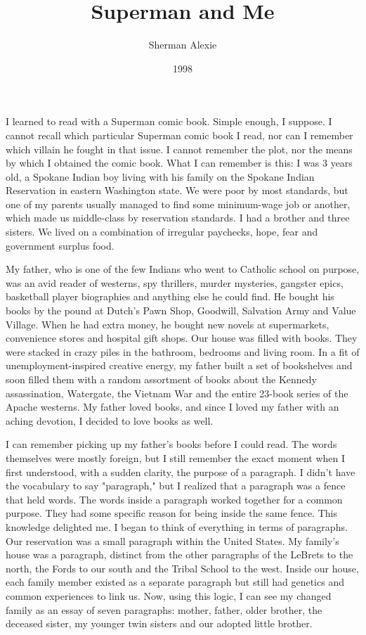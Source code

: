 \documentclass[10pt,a4paper]{article}
\begin{document}
\title{Superman and Me}
\date{1998}
\author{Sherman Alexie}

\maketitle

\noindent\linenumbers I learned to read with a Superman comic book. Simple enough, I suppose. I cannot recall which particular Superman comic book I read, nor can I remember which villain he fought in that issue. I cannot remember the plot, nor the means by which I obtained the comic book. What I can remember is this: I was 3 years old, a Spokane Indian boy living with his family on the Spokane Indian Reservation in eastern Washington state. We were poor by most standards, but one of my parents usually managed to find some minimum-wage job or another, which made us middle-class by reservation standards. I had a brother and three sisters. We lived on a combination of irregular paychecks, hope, fear and government surplus food.

My father, who is one of the few Indians who went to Catholic school on purpose, was an avid reader of westerns, spy thrillers, murder mysteries, gangster epics, basketball player biographies and anything else he could find. He bought his books by the pound at Dutch's Pawn Shop, Goodwill, Salvation Army and Value Village. When he had extra money, he bought new novels at supermarkets, convenience stores and hospital gift shops. Our house was filled with books. They were stacked in crazy piles in the bathroom, bedrooms and living room. In a fit of unemployment-inspired creative energy, my father built a set of bookshelves and soon filled them with a random assortment of books about the Kennedy assassination, Watergate, the Vietnam War and the entire 23-book series of the Apache westerns. My father loved books, and since I loved my father with an aching devotion, I decided to love books as well.

I can remember picking up my father's books before I could read. The words themselves were mostly foreign, but I still remember the exact moment when I first understood, with a sudden clarity, the purpose of a paragraph. I didn't have the vocabulary to say "paragraph," but I realized that a paragraph was a fence that held words. The words inside a paragraph worked together for a common purpose. They had some specific reason for being inside the same fence. This knowledge delighted me. I began to think of everything in terms of paragraphs. Our reservation was a small paragraph within the United States. My family's house was a paragraph, distinct from the other paragraphs of the LeBrets to the north, the Fords to our south and the Tribal School to the west. Inside our house, each family member existed as a separate paragraph but still had genetics and common experiences to link us. Now, using this logic, I can see my changed family as an essay of seven paragraphs: mother, father, older brother, the deceased sister, my younger twin sisters and our adopted little brother.
\end{document}

